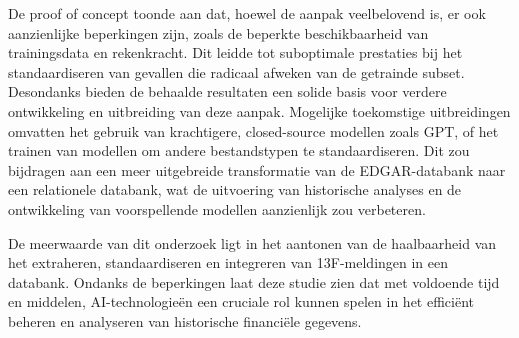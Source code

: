 De proof of concept toonde aan dat, hoewel de aanpak veelbelovend is, er ook aanzienlijke beperkingen zijn, zoals de beperkte beschikbaarheid van trainingsdata en rekenkracht. Dit leidde tot suboptimale prestaties bij het standaardiseren van gevallen die radicaal afweken van de getrainde subset. Desondanks bieden de behaalde resultaten een solide basis voor verdere ontwikkeling en uitbreiding van deze aanpak. Mogelijke toekomstige uitbreidingen omvatten het gebruik van krachtigere, closed-source modellen zoals GPT, of het trainen van modellen om andere bestandstypen te standaardiseren. Dit zou bijdragen aan een meer uitgebreide transformatie van de EDGAR-databank naar een relationele databank, wat de uitvoering van historische analyses en de ontwikkeling van voorspellende modellen aanzienlijk zou verbeteren.

De meerwaarde van dit onderzoek ligt in het aantonen van de haalbaarheid van het extraheren, standaardiseren en integreren van 13F-meldingen in een databank. Ondanks de beperkingen laat deze studie zien dat met voldoende tijd en middelen, AI-technologieën een cruciale rol kunnen spelen in het efficiënt beheren en analyseren van historische financiële gegevens.










